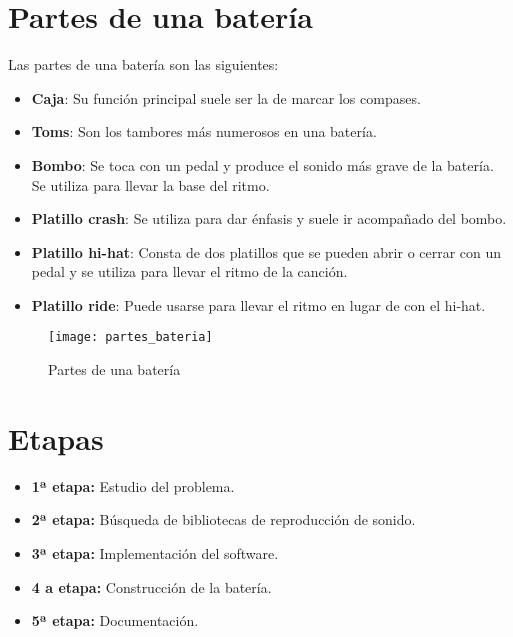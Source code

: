 
    \section{Partes de una batería} %
    \label{sec:PartesDeUnaBateria}

        Las partes de una batería son las siguientes:

        \begin{itemize}
            \item \textbf{Caja}: Su función principal suele ser la de marcar los compases.
            \item \textbf{Toms}: Son los tambores más numerosos en una batería.
            \item \textbf{Bombo}: Se toca con un pedal y produce el sonido más grave de la batería. Se utiliza para
            llevar la base del ritmo.
            \item \textbf{Platillo crash}: Se utiliza para dar énfasis y suele ir acompañado del bombo.
            \item \textbf{Platillo hi-hat}: Consta de dos platillos que se pueden abrir o cerrar con un pedal y se
            utiliza para llevar el ritmo de la canción.
            \item \textbf{Platillo ride}: Puede usarse para llevar el ritmo en lugar de con el hi-hat.
        \end{itemize}

        \newpage

        \begin{figure}[ht]
            \centering
            \texttt{[image: partes\_bateria]}
            \caption{Partes de una batería \cite{partes_bateria_fuente}\label{fig:PartesBateria}}
        \end{figure}


    \section{Etapas} %
    \label{sec:Etapas}

        \begin{itemize}
            \item \textbf{1ª etapa:} Estudio del problema.

            \item \textbf{2ª etapa:} Búsqueda de bibliotecas de reproducción de sonido.

            \item \textbf{3ª etapa:} Implementación del software.

            \item \textbf{4 a etapa:} Construcción de la batería.

            \item \textbf{5ª etapa:} Documentación.
        \end{itemize}


